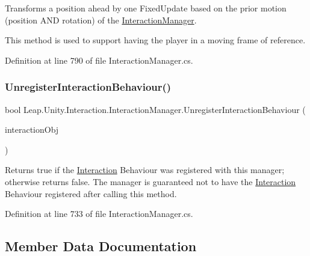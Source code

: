 Transforms a position ahead by one Fixed\+Update based on the prior motion (position A\+ND rotation) of the \mbox{\hyperlink{class_leap_1_1_unity_1_1_interaction_1_1_interaction_manager}{Interaction\+Manager}}. 

This method is used to support having the player in a moving frame of reference. 

Definition at line 790 of file Interaction\+Manager.\+cs.

\mbox{\label{class_leap_1_1_unity_1_1_interaction_1_1_interaction_manager_a789f594e57a18f29111f81ada09cd262}} 
\subsubsection{\texorpdfstring{UnregisterInteractionBehaviour()}{UnregisterInteractionBehaviour()}}
{\footnotesize\ttfamily bool Leap.\+Unity.\+Interaction.\+Interaction\+Manager.\+Unregister\+Interaction\+Behaviour (\begin{DoxyParamCaption}\item[{\mbox{\hyperlink{interface_leap_1_1_unity_1_1_interaction_1_1_i_interaction_behaviour}{I\+Interaction\+Behaviour}}}]{interaction\+Obj }\end{DoxyParamCaption})}



Returns true if the \mbox{\hyperlink{namespace_leap_1_1_unity_1_1_interaction}{Interaction}} Behaviour was registered with this manager; otherwise returns false. The manager is guaranteed not to have the \mbox{\hyperlink{namespace_leap_1_1_unity_1_1_interaction}{Interaction}} Behaviour registered after calling this method. 



Definition at line 733 of file Interaction\+Manager.\+cs.



\subsection{Member Data Documentation}
\mbox{\label{class_leap_1_1_unity_1_1_interaction_1_1_interaction_manager_a67b3425669699e61b3649ed83f5b3283}} 
